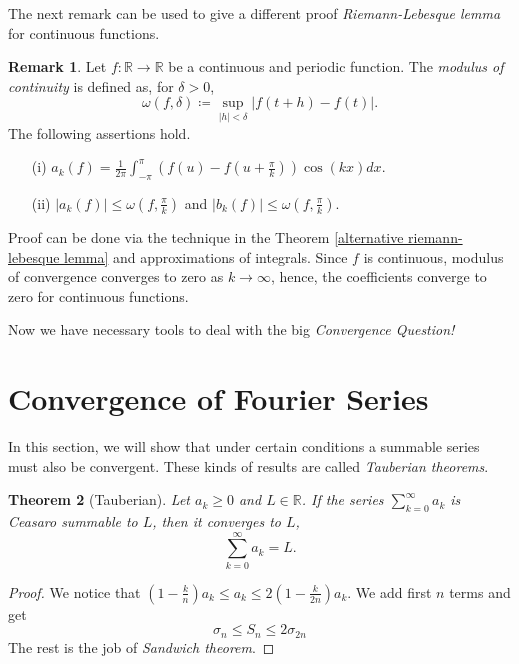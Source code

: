 \documentclass[12pt]{amsart}
\newtheorem{theorem}{Theorem}[section]
\theoremstyle{definition}
\newtheorem{remark}[theorem]{Remark}
\newcommand{\RR}{{\mathbb R}} %
\begin{document}


The next remark can be used to give a different proof \emph{Riemann-Lebesque lemma} for continuous functions.


\begin{remark}
    Let $f: \RR \to \RR$ be a continuous and periodic function. The \emph{modulus of continuity} is defined as, for $\delta > 0$,
    \[
    \omega(f, \delta) \coloneqq \sup_{|h| < \delta}|f(t+h) - f(t)|.
    \] The following assertions hold.
    \begin{itemize}
        \item[(i)] $a_k(f) = \frac{1}{2\pi}  \int_{-\pi}^{\pi} (f(u) - f(u + \frac{\pi}{k}))\cos(kx)dx$.
        \item[(ii)] $|a_k(f)| \leq \omega(f, \frac{\pi}{k})$ and $|b_k(f)| \leq \omega(f, \frac{\pi}{k})$.
    \end{itemize}
\end{remark}


Proof can be done via the technique in the Theorem \ref{alternative riemann-lebesque lemma} and approximations of integrals. Since $f$ is continuous, modulus of convergence converges to zero as $k \to \infty$, hence, the coefficients converge to zero for continuous functions.


\par Now we have necessary tools to deal with the big \emph{Convergence Question!}



\section{Convergence of Fourier Series}


In this section, we will show that under certain conditions a summable series must also be convergent. These kinds of results are called \emph{Tauberian theorems}.


\begin{theorem}[Tauberian]
    Let $a_k \geq 0$ and $L \in \RR$. If the series $\sum_{k=0}^{\infty} a_k$ is Ceasaro summable to $L$, then it converges to $L$,
    \[
    \sum_{k=0}^{\infty} a_k = L.
    \]
\end{theorem}


\begin{proof}
    We notice that  $(1-\frac{k}{n})a_k \leq a_k \leq 2(1-\frac{k}{2n})a_k$. We add first $n$ terms and get
    \[
    \sigma_n \leq S_n \leq 2 \sigma_{2n}
    \]
    The rest is the job of \textit{Sandwich theorem}.
\end{proof}
\end{document}
